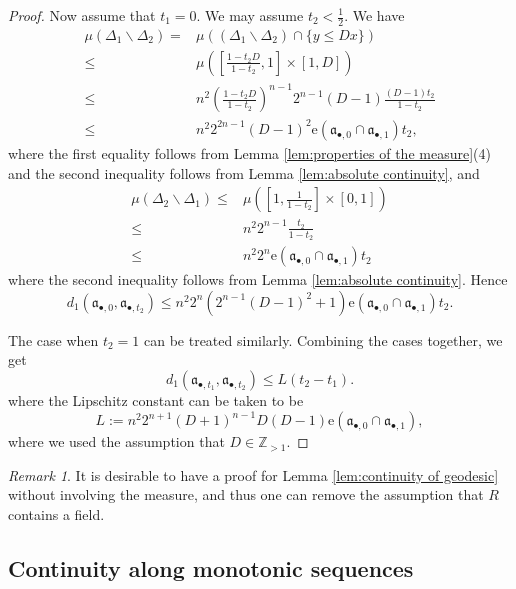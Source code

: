 \documentclass[11pt, leqno]{amsart}%
\theoremstyle{plain}
\theoremstyle{definition}
\theoremstyle{remark}
\newtheorem{remark}[theorem]{Remark}
\newcommand{\bZ}{\mathbb{Z}}
\newcommand{\fa}{\mathfrak{a}}
\newcommand{\e}{\mathrm{e}}
\numberwithin{equation}{section}
\begin{document}
\begin{proof}
    Now assume that $t_1=0$. We may assume $t_2<\frac{1}{2}$. We have
    \begin{align*}
        \mu(\Delta_1\backslash\Delta_2)
        =& \mu((\Delta_1\backslash\Delta_2)\cap\{y\le Dx\})\\
        \le &\mu([\frac{1-t_2D}{1-t_2},1]\times [1,D])\\
        \le &n^2 (\frac{1-t_2D}{1-t_2})^{n-1} 2^{n-1} (D-1)\frac{(D-1)t_2}{1-t_2}\\
        \le &n^2 2^{2n-1}(D-1)^2 \e(\fa_{\bullet,0}\cap\fa_{\bullet,1})t_2,
    \end{align*}
    where the first equality follows from Lemma \ref{lem:properties of the measure}(4) and the second inequality follows from Lemma \ref{lem:absolute continuity}, and
    \begin{align*}
        \mu(\Delta_2\backslash\Delta_1)
        \le&\mu([1,\frac{1}{1-t_2}]\times[0,1])\\
        \le &n^2 2^{n-1}\frac{t_2}{1-t_2}\\
        \le &n^2 2^n\e(\fa_{\bullet,0}\cap\fa_{\bullet,1}) t_2
    \end{align*}
    where the second inequality follows from Lemma \ref{lem:absolute continuity}. Hence
    \begin{equation}\label{eqn:Lip end}
        d_1(\fa_{\bullet,0},\fa_{\bullet,t_2})\le n^2 2^n (2^{n-1}(D-1)^2+1)\e(\fa_{\bullet,0}\cap\fa_{\bullet,1})t_2.
    \end{equation}
	
    The case when $t_2=1$ can be treated similarly. Combining the cases together, we get 
    \[
        d_1(\fa_{\bullet,t_1},\fa_{\bullet,t_2})\le L(t_2-t_1).
    \]
    where the Lipschitz constant can be taken to be 
    \[
        L:=n^2 2^{n+1} (D+1)^{n-1}D(D-1)\e(\fa_{\bullet,0}\cap\fa_{\bullet,1}),
    \]
    where we used the assumption that $D\in\bZ_{>1}$. 
\end{proof}

\begin{remark}
    It is desirable to have a proof for Lemma \ref{lem:continuity of geodesic} without involving the measure, and thus one can remove the assumption that $R$ contains a field.
\end{remark}


\subsection{Continuity along monotonic sequences}\label{ssec:monitonic}
\end{document}
